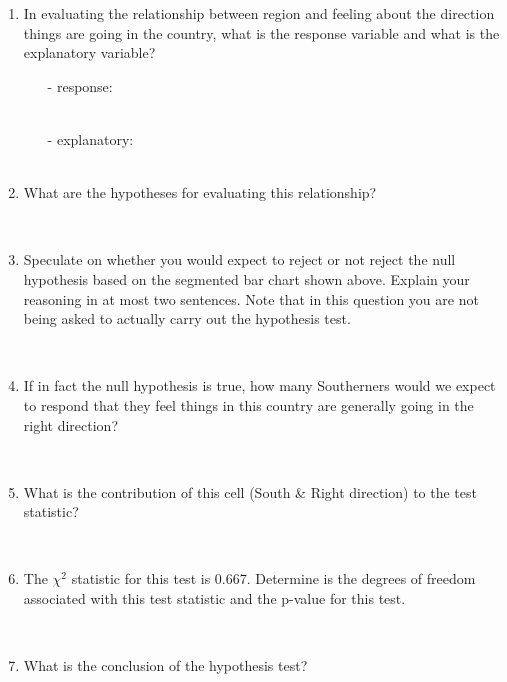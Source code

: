 \documentclass[12pt]{article}
\newcommand{\soln}[2]{$\:$\\ \vspace{#1}}{}
\begin{document}
\begin{enumerate}

\item In evaluating the relationship between region and feeling about the direction things 
are going in the country, what is the response variable and what is the explanatory variable?
\begin{itemize}
\item[-] response: \soln{0.2cm}{direction} \\
\item[-] explanatory: \soln{0.2cm}{region} \\
\end{itemize}

\item What are the hypotheses for evaluating this relationship?

\soln{3cm}{$H_0:$ Region and opinion on direction are independent. \\
$H_A:$ Region and opinion on direction are dependent. \\
}

\item Speculate on whether you would expect to reject or not reject the null hypothesis based on the 
segmented bar chart shown above. Explain your reasoning in at most two sentences. Note that in
this question you are not being asked to actually carry out the hypothesis test.

\soln{3cm}{No, \\
P(right direction $|$ each level of the region variable) is roughly equal, chances are we won't reject $H_0$.}

\item If in fact the null hypothesis is true, how many Southerners would we expect to respond that 
they feel things in this country are generally going in the right direction?

\soln{3cm}{$E = \frac{193 \times 171}{500} = 66.006$}

\item What is the contribution of this cell (South \& Right direction) to the test statistic?

\soln{3cm}{$\frac{(62 - 66.006)^2}{66.006} = 0.24313$}

\item The $\chi^2$ statistic for this test is 0.667. Determine is the degrees of freedom associated with this
test statistic and the p-value for this test.

\soln{3cm}{$df = (R - 1) \times (C - 1) = 3 \times 1 = 3$ \\
$p-value = 0.8809$ (or something around this if using the table)
}

\item What is the conclusion of the hypothesis test?

\soln{1cm}{Fail to reject $H_0$. The data do not provide convincing evidence for a relationship
between region and feeling about the direction things are going in the country.
}

\end{enumerate}
\end{document}
